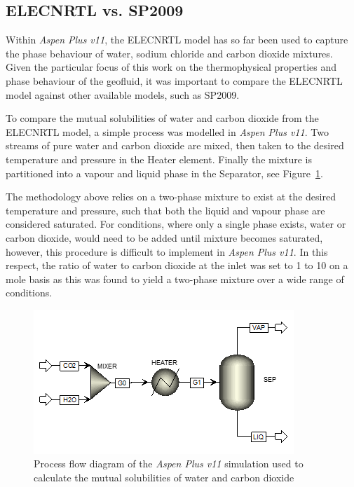 \subsection{ELECNRTL vs. SP2009}
    Within \emph{Aspen Plus v11}, the ELECNRTL model has so far been used to capture the phase behaviour of water, sodium chloride and carbon dioxide mixtures. Given the particular focus of this work on the thermophysical properties and phase behaviour of the geofluid, it was important to compare the ELECNRTL model against other available models, such as \ac{SP2009}.

    To compare the mutual solubilities of water and carbon dioxide from the ELECNRTL model, a simple process was modelled in \emph{Aspen Plus v11}. Two streams of pure water and carbon dioxide are mixed, then taken to the desired temperature and pressure in the Heater element. Finally the mixture is partitioned into a vapour and liquid phase in the Separator, see Figure~\ref{fig:SP2009vsAspen_process_diagram}. 

    The methodology above relies on a two-phase mixture to exist at the desired temperature and pressure, such that both the liquid and vapour phase are considered saturated. For conditions, where only a single phase exists, water or carbon dioxide, would need to be added until mixture becomes saturated, however, this procedure is difficult to implement in \emph{Aspen Plus v11}. In this respect, the ratio of water to carbon dioxide at the inlet was set to 1 to 10 on a mole basis as this was found to yield a two-phase mixture over a wide range of conditions.

    \begin{figure}[H]
        \centering
        \includegraphics{Content/TPPM/CaseStudies/Figures/Aspen11vsSP2009_process_diagram.png}
        \caption{Process flow diagram of the \emph{Aspen Plus v11} simulation used to calculate the mutual solubilities of water and carbon dioxide}
        \label{fig:SP2009vsAspen_process_diagram}
    \end{figure}

